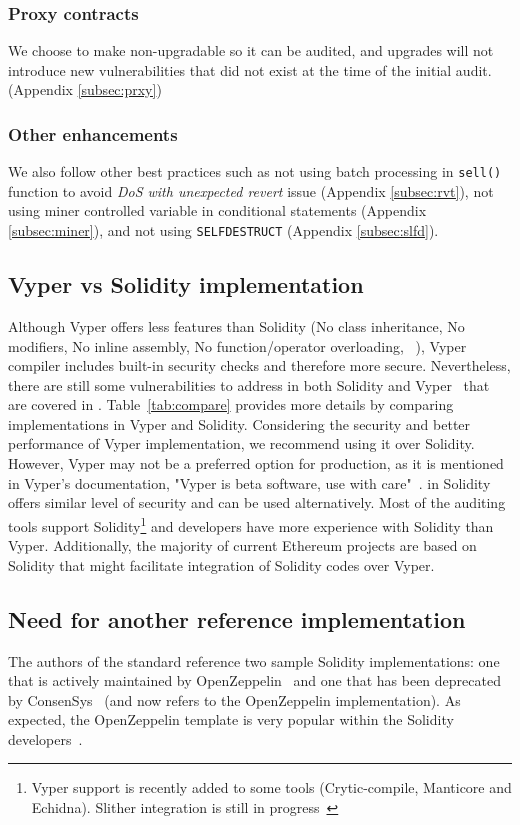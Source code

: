 \subsubsection{Proxy contracts}
We choose to make \sys non-upgradable so it can be audited, and upgrades will not introduce new vulnerabilities that did not exist at the time of the initial audit. (\cf Appendix \ref{subsec:prxy})
	
\subsubsection{Other enhancements}
We also follow other best practices such as not using batch processing in \texttt{sell()} function to avoid \textit{DoS with unexpected revert} issue (\cf Appendix \ref{subsec:rvt}), not using miner controlled variable in conditional statements (\cf Appendix \ref{subsec:miner}), and not using \texttt{SELFDESTRUCT} (\cf Appendix \ref{subsec:slfd}).

\subsection{Vyper vs Solidity implementation}
Although Vyper offers less features than Solidity (\eg No class inheritance, No modifiers, No inline assembly, No function/operator overloading, \etc~\cite{SolidityDoc}), Vyper compiler includes built-in security checks and therefore more secure. Nevertheless, there are still some vulnerabilities to address in both Solidity and Vyper~\cite{Vyper1} that are covered in \sys. Table~\ref{tab:compare} provides more details by comparing \sys implementations in Vyper and Solidity. Considering the security and better performance of Vyper implementation, we recommend using it over Solidity. However, Vyper may not be a preferred option for production, as it is mentioned in Vyper's documentation, "Vyper is beta software, use with care"~\cite{VyperReadme}. \sys in Solidity offers similar level of security and can be used alternatively. Most of the auditing tools support Solidity\footnote{Vyper support is recently added to some tools (\eg Crytic-compile, Manticore and Echidna). Slither integration is still in progress~\cite{Crytic}} and developers have more experience with Solidity than Vyper. Additionally, the majority of current Ethereum projects are based on Solidity that might facilitate integration of Solidity codes over Vyper.

	
\subsection{Need for another reference implementation}
The authors of the \erc standard reference two sample Solidity implementations: one that is actively maintained by OpenZeppelin~\cite{OpenZepplin} and one that has been deprecated by ConsenSys~\cite{ConsensysToken} (and now refers to the OpenZeppelin implementation). As expected, the OpenZeppelin template is very popular within the Solidity developers~\cite{OPZ1,OPZ2,OPZ3}.

